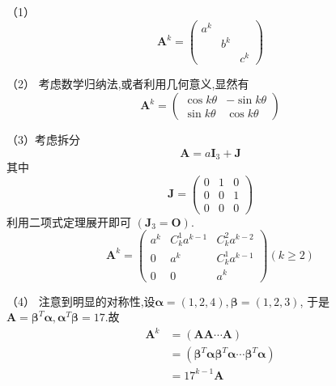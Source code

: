\begin{solution}
	\textup{（1）}
	\[
	\bm{A}^k=\begin{pmatrix}
		a^k&&\\
		&b^k&\\
		&&c^k
	\end{pmatrix}
	\]

	\textup{（2）}
	考虑数学归纳法,或者利用几何意义,显然有
	\[
	\bm{A}^k=\begin{pmatrix}
		\cos k\theta &-\sin k\theta\\
		\sin k\theta &\cos k\theta
	\end{pmatrix}
	\]

	\textup{（3）}考虑拆分\[
	\bm{A}=a\bm{I}_3+\bm{J}
	\]
	其中
	\[
	\bm{J}=\begin{pmatrix}
		0&1&0\\0&0&1\\0&0&0
	\end{pmatrix}
	\]
	利用二项式定理展开即可
	$\left(\bm{J}_3=\bm{O}\right)$.
	\[
	\bm{A}^k=\begin{pmatrix}
		a^k&C_k^1a^{k-1}&C_k^2a^{k-2}\\
		0&a^k&C_k^1a^{k-1}\\
		0&0&a^k
	\end{pmatrix}\left(k\geqslant 2\right)
	\]

	\textup{（4）}
	注意到明显的对称性,设$\bm{\alpha}=\left(1,2,4
	\right),\bm{\beta}=\left(1,2,3\right)$,
	于是$\bm{A}=\bm{\beta}^T\bm{\alpha},
	\bm{\alpha}^T\bm{\beta}=17$.故
	\begin{align*}
			\bm{A}^k&=\left(\bm{A}\bm{A}\cdots\bm{A}\right)
\\
		&=\left(\bm{\beta}^T\bm{\alpha}\bm{\beta}^T\bm{\alpha}\cdots\bm{\beta}^T\bm{\alpha}\right)
		\\
		&=17^{k-1}\bm{A}
	\end{align*}
\end{solution}

